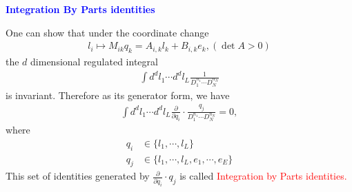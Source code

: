 \documentclass[10pt]{article}
\begin{document}
\textbf{\textcolor{blue}{Integration By Parts identities}}

One can show that under the coordinate change
\begin{align*}
l_i \mapsto M_{ik}q_k = A_{i,k}l_k + B_{i,k}e_k, (\det A > 0)
\end{align*}
the \(d\) dimensional regulated integral
\begin{align*}
\int d^d l_1 \cdots d^d l_L \frac{1}{D_1^{n_1} \cdots D_{N}^{n_N} }
\end{align*}
is invariant.
Therefore as its generator form, we have
\begin{align*}
\int d^d l_1 \cdots d^d l_L \frac{\partial}{ \partial q_i} \cdot \frac{q_j}{D_1^{n_1} \cdots D_{N}^{n_N} }
=
0,
\end{align*}
where
\begin{align*}
q_i &\in  \{l_1, \cdots, l_L \} \\
q_j &\in \{l_1, \cdots, l_L, e_1, \cdots, e_E \}
\end{align*}
This set of identities generated by $\frac{\partial}{ \partial q_i} \cdot q_j$ is called \textcolor{red}{Integration by Parts identities.}
\end{document}
